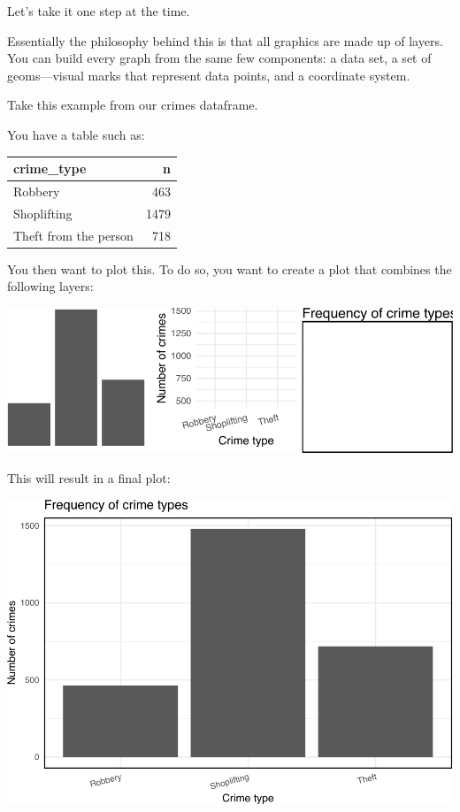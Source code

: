 \documentclass[
  krantz2]{krantz}
\begin{document}
Let's take it one step at the time.

Essentially the philosophy behind this is that all graphics are made up of layers. You can build every graph from the same few components: a data set, a set of geoms---visual marks that represent data points, and a coordinate system.

Take this example from our crimes dataframe.

You have a table such as:

\begin{tabular}{l|r}
\hline
crime\_type & n\\
\hline
Robbery & 463\\
\hline
Shoplifting & 1479\\
\hline
Theft from the person & 718\\
\hline
\end{tabular}

You then want to plot this. To do so, you want to create a plot that combines the following layers:

\includegraphics{crime_mapping_files/figure-latex/unnamed-chunk-5-1.pdf}

This will result in a final plot:

\includegraphics{crime_mapping_files/figure-latex/unnamed-chunk-6-1.pdf}
\end{document}
